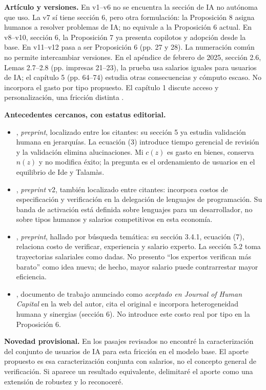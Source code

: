\documentclass[11pt]{article}
\begin{document}
\textbf{Artículo y versiones.} En v1--v6 no se encuentra la sección de IA no autónoma que uso. La v7 sí tiene sección 6, pero otra formulación: la Proposición 8 asigna humanos a resolver problemas de IA; no equivale a la Proposición 6 actual. En v8--v10, sección 6, la Proposición 7 ya presenta copilotos y adopción desde la base. En v11--v12 pasa a ser Proposición 6 (pp. 27 y 28). La numeración común no permite intercambiar versiones. En el apéndice de febrero de 2025, sección 2.6, Lemas 2.7--2.8 (pp. impresas 21--23), la prueba usa salarios iguales para usuarios de IA; el capítulo 5 (pp. 64--74) estudia otras consecuencias y cómputo escaso. No incorpora el gasto por tipo propuesto. El capítulo 1 discute acceso y personalización, una fricción distinta \citep{appendix}.

\textbf{Antecedentes cercanos, con estatus editorial.}
\begin{itemize}\setlength{\itemsep}{2pt}
\item \citet{xu2025}, \emph{preprint}, localizado entre los citantes: su sección 5 ya estudia validación humana en jerarquías. La ecuación (3) introduce tiempo gerencial de revisión y la validación elimina alucinaciones. Mi $c(z)$ es gasto en bienes, conserva $n(z)$ y no modifica éxito; la pregunta es el ordenamiento de usuarios en el equilibrio de Ide y Talamàs.
\item \citet{quispe2026}, \emph{preprint} v2, también localizado entre citantes: incorpora costos de especificación y verificación en la delegación de lenguajes de programación. Su banda de activación está definida sobre lenguajes para un desarrollador, no sobre tipos humanos y salarios competitivos en esta economía.
\item \citet{catalini}, \emph{preprint}, hallado por búsqueda temática: su sección 3.4.1, ecuación (7), relaciona costo de verificar, experiencia y salario experto. La sección 5.2 toma trayectorias salariales como dadas. No presento ``los expertos verifican más barato'' como idea nueva; de hecho, mayor salario puede contrarrestar mayor eficiencia.
\item \citet{turing}, documento de trabajo anunciado como \emph{aceptado en Journal of Human Capital} en la web del autor, cita el original e incorpora heterogeneidad humana y sinergias (sección 6). No introduce este costo real por tipo en la Proposición 6.
\end{itemize}
\textbf{Novedad provisional.} En los pasajes revisados no encontré la caracterización del conjunto de usuarios de IA para esta fricción en el modelo base. El aporte propuesto es esa caracterización conjunta con salarios, no el concepto general de verificación. Si aparece un resultado equivalente, delimitaré el aporte como una extensión de robustez y lo reconoceré.
\newpage
\end{document}
